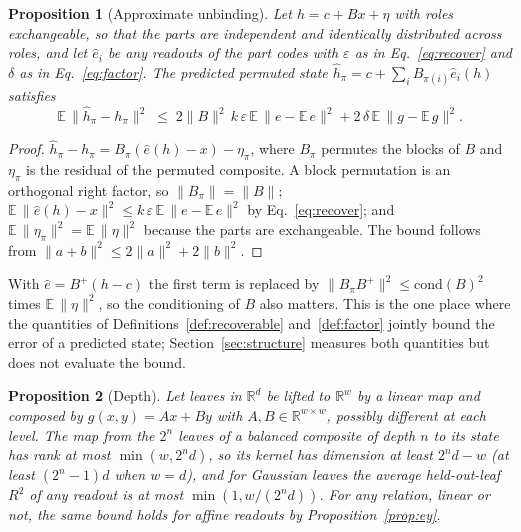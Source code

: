\documentclass[10pt]{article}
\theoremstyle{plain}
\newtheorem{proposition}{Proposition}
\theoremstyle{remark}
\newcommand{\R}{\mathbb{R}}
\begin{document}
\begin{proposition}[Approximate unbinding]
\label{prop:approx}
Let $h = c + Bx + \eta$ with roles exchangeable, so that the parts are independent and identically distributed across roles, and let $\hat{e}_i$ be any readouts of the part codes with $\varepsilon$ as in Eq.~\eqref{eq:recover} and $\delta$ as in Eq.~\eqref{eq:factor}. The predicted permuted state $\hat{h}_\pi = c + \sum_i B_{\pi(i)}\hat{e}_i(h)$ satisfies
\begin{equation}
  \mathbb{E}\,\lVert \hat{h}_\pi - h_\pi \rVert^2 \;\le\; 2\lVert B \rVert^2\, k\,\varepsilon\, \mathbb{E}\,\lVert e - \mathbb{E}\,e \rVert^2 + 2\,\delta\, \mathbb{E}\,\lVert g - \mathbb{E}\,g \rVert^2 .
\end{equation}
\end{proposition}

\begin{proof}
$\hat{h}_\pi - h_\pi = B_\pi(\hat{e}(h) - x) - \eta_\pi$, where $B_\pi$ permutes the blocks of $B$ and $\eta_\pi$ is the residual of the permuted composite. A block permutation is an orthogonal right factor, so $\lVert B_\pi \rVert = \lVert B \rVert$; $\mathbb{E}\,\lVert \hat{e}(h) - x \rVert^2 \le k\,\varepsilon\,\mathbb{E}\,\lVert e - \mathbb{E}\,e\rVert^2$ by Eq.~\eqref{eq:recover}; and $\mathbb{E}\,\lVert \eta_\pi \rVert^2 = \mathbb{E}\,\lVert \eta \rVert^2$ because the parts are exchangeable. The bound follows from $\lVert a + b \rVert^2 \le 2\lVert a \rVert^2 + 2\lVert b \rVert^2$.
\end{proof}

\noindent
With $\hat{e} = B^{+}(h - c)$ the first term is replaced by $\lVert B_\pi B^{+} \rVert^2 \le \mathrm{cond}(B)^2$ times $\mathbb{E}\,\lVert \eta \rVert^2$, so the conditioning of $B$ also matters. This is the one place where the quantities of Definitions~\ref{def:recoverable} and~\ref{def:factor} jointly bound the error of a predicted state; Section~\ref{sec:structure} measures both quantities but does not evaluate the bound.

\begin{proposition}[Depth]
\label{prop:depth}
Let leaves in $\R^d$ be lifted to $\R^w$ by a linear map and composed by $g(x, y) = Ax + By$ with $A, B \in \R^{w \times w}$, possibly different at each level. The map from the $2^n$ leaves of a balanced composite of depth $n$ to its state has rank at most $\min(w, 2^n d)$, so its kernel has dimension at least $2^n d - w$ (at least $(2^n - 1)d$ when $w = d$), and for Gaussian leaves the average held-out-leaf $R^2$ of any readout is at most $\min(1, w/(2^n d))$. For any relation, linear or not, the same bound holds for affine readouts by Proposition~\ref{prop:ey}.
\end{proposition}
\end{document}
